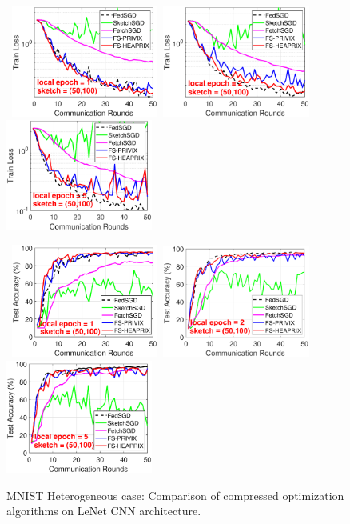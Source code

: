 \documentclass[sigconf, anonymous, review]{acmart}
\begin{document}
\begin{figure}[h]
\begin{center}
		\mbox{%
		\includegraphics[width=1.9in]{MNIST_figures/local1_sketch50_iid0_train_loss.eps}%
		\includegraphics[width=1.9in]{MNIST_figures/local2_sketch50_iid0_train_loss.eps}%
		\includegraphics[width=1.9in]{MNIST_figures/local5_sketch50_iid0_train_loss.eps}}
		
		\mbox{%
		\includegraphics[width=1.9in]{MNIST_figures/local1_sketch50_iid0_test_acc.eps}%
		\includegraphics[width=1.9in]{MNIST_figures/local2_sketch50_iid0_test_acc.eps} %
		\includegraphics[width=1.9in]{MNIST_figures/local5_sketch50_iid0_test_acc.eps}
		}
	\end{center}
	\caption{MNIST Heterogeneous case: Comparison of compressed optimization algorithms on LeNet CNN architecture.}
    \label{fig:MNIST-iid0-app}
\end{figure}
\end{document}
